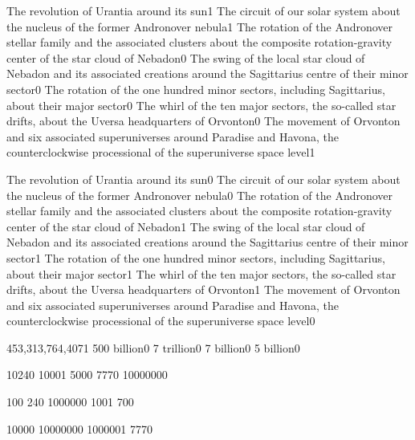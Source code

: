 {The revolution of Urantia around its sun}{1}
{The circuit of our solar system about the nucleus of the former Andronover nebula}{1}
{The rotation of the Andronover stellar family and the associated clusters about the composite rotation-gravity center of the star cloud of Nebadon}{0}
{The swing of the local star cloud of Nebadon and its associated creations around the Sagittarius centre of their minor sector}{0}
{The rotation of the one hundred minor sectors, including Sagittarius, about their major sector}{0}
{The whirl of the ten major sectors, the so-called star drifts, about the Uversa headquarters of Orvonton}{0}
{The movement of Orvonton and six associated superuniverses around Paradise and Havona, the counterclockwise processional of the superuniverse space level}{1}
\qstop

{The revolution of Urantia around its sun}{0}
{The circuit of our solar system about the nucleus of the former Andronover nebula}{0}
{The rotation of the Andronover stellar family and the associated clusters about the composite rotation-gravity center of the star cloud of Nebadon}{1}
{The swing of the local star cloud of Nebadon and its associated creations around the Sagittarius centre of their minor sector}{1}
{The rotation of the one hundred minor sectors, including Sagittarius, about their major sector}{1}
{The whirl of the ten major sectors, the so-called star drifts, about the Uversa headquarters of Orvonton}{1}
{The movement of Orvonton and six associated superuniverses around Paradise and Havona, the counterclockwise processional of the superuniverse space level}{0}
\qstop

{453,313,764,407}{1}
{500 billion}{0}
{7 trillion}{0}
{7 billion}{0}
{5 billion}{0}
\qstop

{1024}{0}
{1000}{1}
{500}{0}
{777}{0}
{1000000}{0}
\qstop

{10}{0}
{24}{0}
{100000}{0}
{100}{1}
{70}{0}
\qstop

{1000}{0}
{1000000}{0}
{100000}{1}
{777}{0}
\qstop

